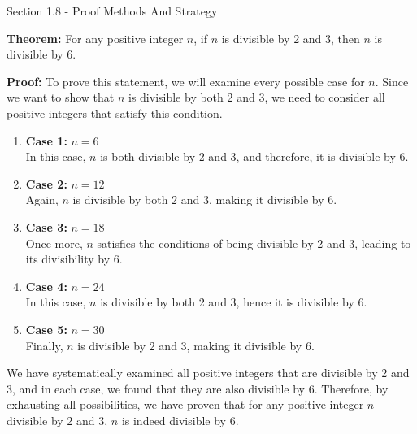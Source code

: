 \begin{notes}{Section 1.8 - Proof Methods And Strategy}
    \begin{Highlight}
        \textbf{Theorem:} For any positive integer \(n\), if \(n\) is divisible by 2 and 3, then \(n\) is divisible by 6. 
    
    
        \textbf{Proof:} To prove this statement, we will examine every possible case for \(n\). Since we want to show that \(n\) is divisible by both 2 and 3, we need to consider all positive integers 
        that satisfy this condition.
    
        \begin{enumerate}
            \item \textbf{Case 1:} \(n = 6\) \\
            In this case, \(n\) is both divisible by 2 and 3, and therefore, it is divisible by 6.
    
            \item \textbf{Case 2:} \(n = 12\) \\
            Again, \(n\) is divisible by both 2 and 3, making it divisible by 6.
    
            \item \textbf{Case 3:} \(n = 18\) \\
            Once more, \(n\) satisfies the conditions of being divisible by 2 and 3, leading to its divisibility by 6.
    
            \item \textbf{Case 4:} \(n = 24\) \\
            In this case, \(n\) is divisible by both 2 and 3, hence it is divisible by 6.
    
            \item \textbf{Case 5:} \(n = 30\) \\
            Finally, \(n\) is divisible by 2 and 3, making it divisible by 6.
    
        \end{enumerate}
    
    
        We have systematically examined all positive integers that are divisible by 2 and 3, and in each case, we found that they are also divisible by 6. Therefore, by exhausting all possibilities, 
        we have proven that for any positive integer \(n\) divisible by 2 and 3, \(n\) is indeed divisible by 6.
    \end{Highlight}
    

\end{notes}
